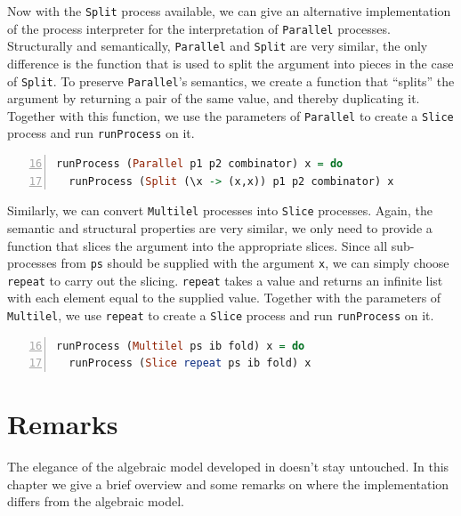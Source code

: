 Now with the \texttt{Split} process available, we can give an alternative implementation of the process interpreter for the interpretation of \texttt{Parallel} processes. Structurally and semantically, \texttt{Parallel} and \texttt{Split} are very similar, the only difference is the function that is used to split the argument into pieces in the case of \texttt{Split}. To preserve \texttt{Parallel}'s semantics, we create a function that \enquote{splits} the argument by returning a pair of the same value, and thereby duplicating it. Together with this function, we use the parameters of \texttt{Parallel} to create a \texttt{Slice} process and run \texttt{runProcess} on it.
\begin{lstlisting}[language=Haskell,caption=Alternative implementation of the interpreter for \texttt{Parallel} processes.,label=lst:local_runprocess_split,numbers=left,frame=bt,firstnumber=16]
runProcess (Parallel p1 p2 combinator) x = do
  runProcess (Split (\x -> (x,x)) p1 p2 combinator) x
\end{lstlisting}

Similarly, we can convert \texttt{Multilel} processes into \texttt{Slice} processes. Again, the semantic and structural properties are very similar, we only need to provide a function that slices the argument into the appropriate slices. Since all sub-processes from \texttt{ps} should be supplied with the argument \texttt{x}, we can simply choose \texttt{repeat} to carry out the slicing. \texttt{repeat} takes a value and returns an infinite list with each element equal to the supplied value. Together with the parameters of \texttt{Multilel}, we use \texttt{repeat} to create a \texttt{Slice} process and run \texttt{runProcess} on it.
\begin{lstlisting}[language=Haskell,caption=Alternative implementation of the interpreter for \texttt{Multilel} processes.,label=lst:local_runprocess_slice,numbers=left,frame=bt,firstnumber=16]
runProcess (Multilel ps ib fold) x = do
  runProcess (Slice repeat ps ib fold) x
\end{lstlisting}

\section{Remarks}
\label{chp:implementation_remarks}
The elegance of the algebraic model developed in  doesn't stay untouched. In this chapter we give a brief overview and some remarks on where the implementation differs from the algebraic model.

